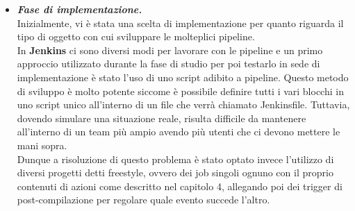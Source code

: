 \documentclass[a4paper,12pt]{report}
\begin{document}
\begin{itemize}
\item \textit{\textbf{Fase di implementazione.}}\\
Inizialmente, vi è stata una scelta di implementazione per quanto riguarda il tipo di oggetto con cui sviluppare le molteplici pipeline.\\
In \textbf{Jenkins} ci sono diversi modi per lavorare con le pipeline e un primo approccio utilizzato durante la fase di studio per poi testarlo in sede di implementazione è stato l'uso di uno script adibito a pipeline. Questo metodo di sviluppo è molto potente siccome è possibile definire tutti i vari blocchi in uno script unico all'interno di un file che verrà chiamato Jenkinsfile. Tuttavia, dovendo simulare una situazione reale, risulta difficile da mantenere all'interno di un team più ampio avendo più utenti che ci devono mettere le mani sopra.\\
Dunque a risoluzione di questo problema è stato optato invece l'utilizzo di diversi progetti detti freestyle, ovvero dei job singoli ognuno con il proprio contenuti di azioni come descritto nel capitolo 4, allegando poi dei trigger di post-compilazione per regolare quale evento succede l'altro.\\



\end{itemize}
\end{document}
